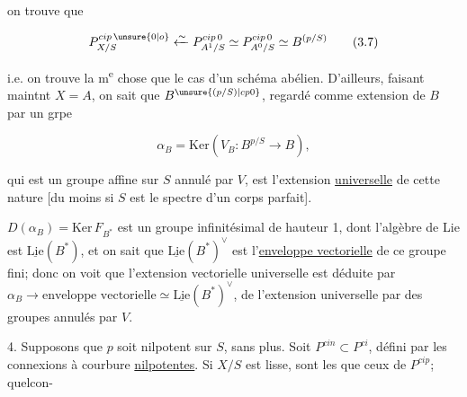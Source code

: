 
on trouve que

\[
P^{cip\,\unsure{0|o}}_{X/S}\xleftarrow{\sim}P^{cip\,0}_{A^1/S}\simeq P^{cip\,0}_{A^0/S}\simeq B^{(p/S)}\tag*{(3.7)}
\]

i.e. on trouve la m\textsuperscript{e} chose que  le cas d'un schéma abélien.  D'ailleurs, faisant  maintnt $X=A$, on sait que $B^{\unsure{(p/S)|cp0}}$, regardé comme extension de $B$ par un grpe 

\[
\alpha_B=\mathrm{Ker}(V_B:B^{p/S}\to B),
\]

qui est un groupe affine sur $S$ annulé par $V$, est l'extension \uline{universelle} de cette nature [du moins  si $S$ est le spectre d'un corps parfait].

$D(\alpha_B)=\mathrm{Ker}\,F_{B^*}$  est un groupe infinitésimal de hauteur 1, dont l'algèbre de Lie est $\underline{\mathrm{Lie}}(B^*)$, et on sait que $\underline{\mathrm{Lie}}(B^*)^\vee$ est l'\uline{enveloppe vectorielle} de ce groupe fini; donc on voit que l'extension vectorielle universelle est déduite par $\alpha_B\longrightarrow\text{enveloppe vectorielle}\simeq\underline{\mathrm{Lie}}(B^*)^\vee$, de l'extension universelle par des groupes annulés par $V$.

4. Supposons que $p$ soit nilpotent sur $S$, sans plus. Soit $P^{cin}\subset P^{ci}$, défini par les connexions à courbure \uline{nilpotentes}. Si $X/S$ est lisse,   sont les  que  ceux de $P^{cip}$;  quelcon-

